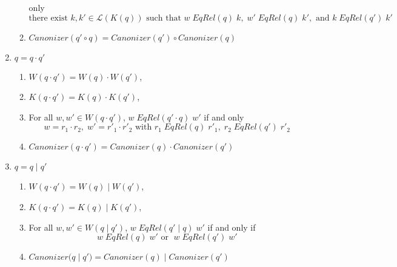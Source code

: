 \documentclass{svproc}
\begin{document}
\begin{enumerate}
\begin{center}
\begin{enumerate}
only $$\text{there exist }k, k' \in
  \mathcal{L}(K(q)) \text{ such that } w \; EqRel(q) \; k, \; w' \;
  EqRel(q) \; k', \text{ and } k \; EqRel(q') \; k' $$
\item
$Canonizer(q' \circ q) = Canonizer(q') \circ Canonizer(q)
$
\end{enumerate}
\begin{prooftree}
\end{prooftree}
\end{center}
\item $q=q \cdot q'$
\begin{center}
\begin{enumerate}
  \item $W(q \cdot q') = W(q) \cdot W(q')$,
  \item $K(q \cdot q') = K(q) \cdot K(q')$, 
  \item
For all $w, w' \in W(q \cdot q')$, $w \; EqRel(q' \cdot q) \; w'$ if and
only $$w = r_1
      \cdot r_2, \; w' = {r'}_1 \cdot {r'}_2 \text{ with } r_1 \; EqRel(q) \;
      {r'}_1, \; r_2 \; EqRel(q') \; {r'}_2$$
\item
$Canonizer(q \cdot q') = Canonizer(q) \cdot Canonizer(q')
$
\end{enumerate}
\begin{prooftree}
\end{prooftree}
\end{center}
\item $q=q \; | \;  q'$
\begin{center}
\begin{enumerate}
  \item $W(q \cdot q') = W(q) \; | \; W(q')$,
  \item $K(q \cdot q') = K(q) \; | \; K(q')$, 
  \item
For all $w, w' \in W(q \; | \; q')$, $w \; EqRel(q' \; | \; q) \; w'$ if and
only if 
$$w \; EqRel(q) \; w' \text{ or } \; w \; EqRel(q') \; w'$$
\item
$Canonizer(q \; | \; q') = Canonizer(q) \; | \; Canonizer(q')
$
\end{enumerate}
\begin{prooftree}

\end{prooftree}
\end{center}
\end{enumerate}
\end{document}
